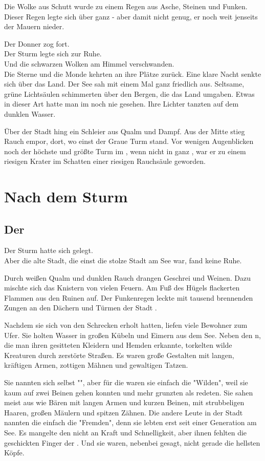\begin{Large}
\begin{itshape}
Die Wolke aus Schutt wurde zu einem Regen aus Asche, Steinen und Funken. Dieser Regen legte sich über ganz {\Tern} - aber damit nicht genug, er noch weit jenseits der Mauern nieder.

Der Donner zog fort.\\
Der Sturm legte sich zur Ruhe.\\
Und die schwarzen Wolken am Himmel verschwanden.\\
Die Sterne und die Monde kehrten an ihre Plätze zurück. 
Eine klare Nacht senkte sich über das Land. Der See sah mit einem Mal ganz friedlich aus. Seltsame, grüne Lichtsäulen schimmerten über den Bergen, die das Land umgaben. Etwas in dieser Art hatte man im {\Enland} noch nie gesehen. Ihre Lichter tanzten auf dem dunklen Wasser. 

Über der Stadt hing ein Schleier aus Qualm und Dampf. Aus der Mitte stieg Rauch empor, dort, wo einst der Graue Turm stand. Vor wenigen Augenblicken noch der höchste und größte Turm im {\Enland}, wenn nicht in ganz {\Rhingell}, war er zu einem riesigen Krater im Schatten einer riesigen Rauchsäule geworden.
\end{itshape}

\part{Nach dem Sturm}
\chapter{Der \Schattenlaufer}
Der Sturm hatte sich gelegt.\\
Aber die alte Stadt, die einst die stolze Stadt {\Tern} am See war, fand keine Ruhe.
 
Durch weißen Qualm und dunklen Rauch drangen Geschrei und Weinen. Dazu mischte sich das Knistern von vielen Feuern. Am Fuß des Hügels flackerten Flammen aus den Ruinen auf. Der Funkenregen leckte mit tausend brennenden Zungen an den Dächern und Türmen der Stadt {\Tern}. 

Nachdem sie sich von den Schrecken erholt hatten, liefen viele Bewohner zum Ufer. Sie holten Wasser in großen Kübeln und Eimern aus dem See. Neben den {\Enlaender}{n}, die man ihren gesitteten Kleidern und Hemden erkannte, torkelten wilde Kreaturen durch zerstörte Straßen. Es waren große Gestalten mit langen, kräftigen Armen, zottigen Mähnen und gewaltigen Tatzen.

Sie nannten sich selbst "{\Bangiri}", aber für die {\Enlaender} waren sie einfach die "Wilden", weil sie kaum auf zwei Beinen gehen konnten und mehr grunzten als redeten. Sie sahen meist aus wie Bären mit langen Armen und kurzen Beinen, mit strubbeligen Haaren, großen Mäulern und spitzen Zähnen. Die andere Leute in der Stadt nannten die {\Bangiri} einfach die "Fremden", denn sie lebten erst seit einer Generation am See. Es mangelte den {\Bangiri} nicht an Kraft und Schnelligkeit, aber ihnen fehlten die geschickten Finger der . Und sie waren, nebenbei gesagt, nicht gerade die hellsten Köpfe. 


\end{Large}
